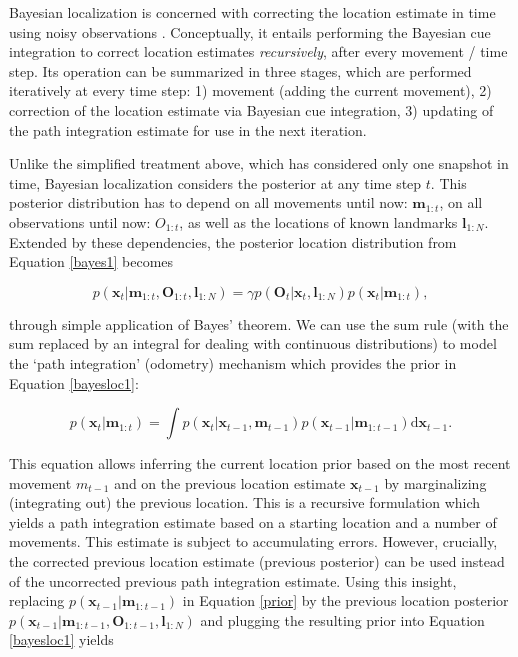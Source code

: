 Bayesian localization is concerned with correcting the location estimate in time using noisy observations \citep{thrun2005probabilistic}. Conceptually, it entails performing the Bayesian cue integration to correct location estimates \textit{recursively}, after every movement / time step. Its operation can be summarized in three stages, which are performed iteratively at every time step: 1) movement (adding the current movement), 2) correction of the location estimate via Bayesian cue integration, 3) updating of the path integration estimate for use in the next iteration.

Unlike the simplified treatment above, which has considered only one snapshot in time, Bayesian localization considers the posterior at any time step $t$. This posterior distribution has to depend on all movements until now: $\bm m_{1:t}$, on all observations until now: $ O_{1:t}$, as well as the locations of known landmarks $\bm l_{1:N}$. Extended by these dependencies, the posterior location distribution from Equation \ref{bayes1} becomes


\begin{equation}
\label{bayesloc1}
p(\bm x_{t} | \bm m_{1:t}, \bm O_{1:t}, \bm l_{1:N}) = \gamma p(\bm O_{t} | \bm x_{t}, \bm l_{1:N}) p(\bm x_{t} | \bm m_{1:t}),
\end{equation}

through simple application of Bayes' theorem. We can use the sum rule (with the sum replaced by an integral for dealing with continuous distributions) to model the `path integration' (odometry) mechanism which provides the prior in Equation \ref{bayesloc1}:

\begin{equation}
\label{prior}
p(\bm x_{t} | \bm m_{1:t}) = \int p(\bm x_{t} | \bm x_{t-1}, \bm m_{t-1}) p(\bm x_{t-1} | \bm m_{1:t-1}) \mathrm{d} \bm x_{t-1}.
\end{equation}

This equation allows inferring the current location prior based on the most recent movement $m_{t-1}$ and on the previous location estimate $\bm x_{t-1}$ by marginalizing (integrating out) the previous location. This is a recursive formulation which yields a path integration estimate based on a starting location and a number of movements. This estimate is subject to accumulating errors. However, crucially, the corrected previous location estimate (previous posterior) can be used instead of the uncorrected previous path integration estimate. Using this insight, replacing $p(\bm x_{t-1} | \bm m_{1:t-1})$ in Equation \ref{prior} by the previous location posterior $p(\bm x_{t-1} | \bm m_{1:t-1}, \bm O_{1:t-1}, \bm l_{1:N})$ and plugging the resulting prior into Equation \ref{bayesloc1} yields

